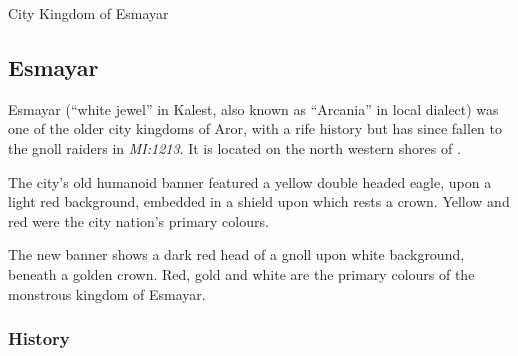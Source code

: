 \cleardoubleevenemptypage


\begin{infobox}{City Kingdom of Esmayar}
  \begin{multicols}{2}
    \begin{itemize}[label={},noitemsep,leftmargin=0.0cm,topsep=0pt]
    \end{itemize}
  \end{multicols}
\end{infobox}

\clearpage

\subsection{Esmayar}
\label{sec:Esmayar}

Esmayar (``white jewel'' in Kalest, also known as ``Arcania'' in local
dialect) was one of the older city kingdoms of Aror, with a rife history but
has since fallen to the gnoll raiders in \emph{MI:1213}. It is located on the
north western shores of .

The city's old humanoid banner featured a yellow double headed eagle, upon a
light red background, embedded in a shield upon which rests a crown. Yellow
and red were the city nation's primary colours.

The new banner shows a dark red head of a gnoll upon white background, beneath
a golden crown. Red, gold and white are the primary colours of the monstrous
kingdom of Esmayar.

\subsubsection{History}

